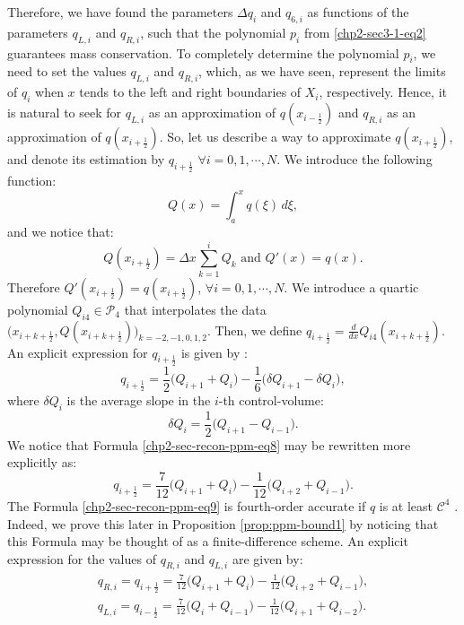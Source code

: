 Therefore, we have found the parameters $\Delta q_i$ and $q_{6, i}$ as
functions of the parameters $q_{L, i}$ and $q_{R, i}$,
such that the polynomial $p_i$ from \eqref{chp2-sec3-1-eq2} 
guarantees mass conservation. To completely determine the 
polynomial $p_i$, we need to set the values $q_{L, i}$ and
$q_{R, i}$, which, as we have seen, represent the limits of $q_i$ when
$x$ tends to the left and right boundaries of $X_i$, respectively.
Hence, it is natural to seek for $q_{L, i}$ as an approximation of $q(x_{i-\frac{1}{2}})$
and $q_{R, i}$ as an approximation of $q(x_{i+\frac{1}{2}})$.
So, let us describe a way to approximate $q(x_{i+\frac{1}{2}})$, and denote its estimation by
$q_{i+\frac{1}{2}}$ $\forall i = 0, 1, \cdots, N$.
We introduce the following function:
\begin{equation}
	\label{chp2-sec-recon-ppm-eq5}
	Q(x) = \int_{a}^{x} q(\xi) \,d\xi,
\end{equation}
and we notice that:
\begin{equation}
	\label{chp2-sec-recon-ppm-eq6}
	Q(x_{i+\frac{1}{2}}) = \Delta x \sum_{k=1}^{i} Q_k \text{ and } Q'(x) = q(x).
\end{equation}
Therefore $Q'(x_{i+\frac{1}{2}}) = q(x_{i+\frac{1}{2}}) $, $\forall i = 0, 1, \cdots, N$.
We introduce a quartic polynomial $Q_{i4} \in \mathcal{P}_4$ that interpolates the data
$\big(x_{i+k+\frac{1}{2}}, Q(x_{i+k+\frac{1}{2}})\big)_{k=-2,-1,0,1,2}$. Then, we define
$q_{i+\frac{1}{2}} = \frac{d}{dx}Q_{i4}(x_{i+k+\frac{1}{2}})$.
An explicit expression for $q_{i+\frac{1}{2}}$ is given by \citep{colella:1984}:
\begin{equation}
	\label{chp2-sec-recon-ppm-eq7}
	q_{i+\frac{1}{2}} = \frac{1}{2} \bigg( Q_{i+1} + Q_{i} \bigg) - \frac{1}{6} \bigg( \delta Q_{i+1} - \delta Q_{i}\bigg),
\end{equation}
where $\delta Q_{i}$ is the average slope in the $i$-th control-volume:
\begin{equation}
	\label{chp2-sec-recon-ppm-eq8}
	\delta Q_{i} = \frac{1}{2} \bigg( Q_{i+1} - Q_{i-1} \bigg).
\end{equation}
We notice that Formula \eqref{chp2-sec-recon-ppm-eq8} may be rewritten more explicitly as:
\begin{equation}
	\label{chp2-sec-recon-ppm-eq9}
	q_{i+\frac{1}{2}} = \frac{7}{12} \bigg( Q_{i+1} + Q_{i} \bigg) - \frac{1}{12} \bigg(  Q_{i+2} +Q_{i-1}\bigg).
\end{equation}
The Formula \eqref{chp2-sec-recon-ppm-eq9} is fourth-order accurate if
$q$ is at least $\mathcal{C}^4$ \citep{colella:1984}. Indeed, we
prove this later in Proposition \ref{prop:ppm-bound1} by noticing
that this Formula may be thought of as a finite-difference scheme. 
An explicit expression for the values of $q_{R,i}$ and $q_{L,i}$ are given by:
\begin{align}
	\label{chp2-sec-recon-ppm-eq10}
	q_{R,i} = q_{i+\frac{1}{2}} = \frac{7}{12} \bigg( Q_{i+1} + Q_{i} \bigg) - \frac{1}{12} \bigg(  Q_{i+2} +Q_{i-1}\bigg), \\
	\label{chp2-sec-recon-ppm-eq11}
	q_{L,i} = q_{i-\frac{1}{2}} = \frac{7}{12} \bigg( Q_{i} + Q_{i-1} \bigg) - \frac{1}{12} \bigg(  Q_{i+1} +Q_{i-2}\bigg).
\end{align}

